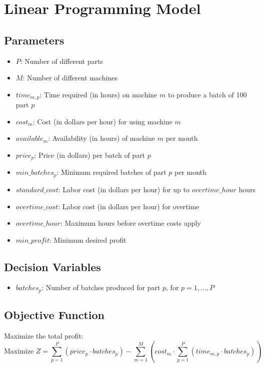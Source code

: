\documentclass{article}
\begin{document}
\section*{Linear Programming Model}

\subsection*{Parameters}
\begin{itemize}
    \item $P$: Number of different parts
    \item $M$: Number of different machines
    \item $time_{m,p}$: Time required (in hours) on machine $m$ to produce a batch of 100 part $p$
    \item $cost_{m}$: Cost (in dollars per hour) for using machine $m$
    \item $available_{m}$: Availability (in hours) of machine $m$ per month
    \item $price_{p}$: Price (in dollars) per batch of part $p$
    \item $min\_batches_{p}$: Minimum required batches of part $p$ per month
    \item $standard\_cost$: Labor cost (in dollars per hour) for up to $overtime\_hour$ hours
    \item $overtime\_cost$: Labor cost (in dollars per hour) for overtime
    \item $overtime\_hour$: Maximum hours before overtime costs apply
    \item $min\_profit$: Minimum desired profit
\end{itemize}

\subsection*{Decision Variables}
\begin{itemize}
    \item $batches_{p}$: Number of batches produced for part $p$, for $p = 1, \ldots, P$
\end{itemize}

\subsection*{Objective Function}
Maximize the total profit:
\[
\text{Maximize } Z = \sum_{p=1}^{P} (price_{p} \cdot batches_{p}) - \sum_{m=1}^{M} (cost_{m} \cdot \sum_{p=1}^{P}(time_{m,p} \cdot batches_{p}))
\]
\end{document}
